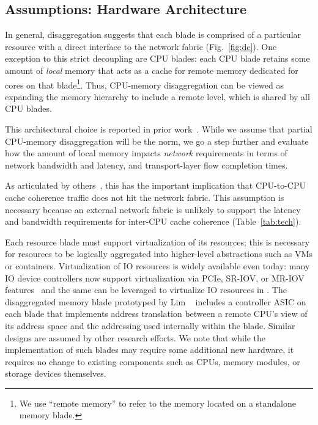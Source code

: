 \vspace{-0.1in}
\subsection{Assumptions: Hardware Architecture}
\vspace{-0.05in}
\label{ssec:hardware}

In general, disaggregation suggests that each blade is comprised of a particular resource with a direct interface to the network fabric (Fig.~\ref{fig:dc}). 
One exception to this strict decoupling are CPU blades: each CPU blade retains some amount of \emph{local} memory that acts as a cache for remote memory dedicated for cores on that blade\footnote{We use ``remote memory'' to refer to the memory located on a standalone memory blade.}.
Thus, CPU-memory disaggregation can be viewed as expanding the memory hierarchy to include a remote level, which is shared by all CPU blades. 

This architectural choice is reported in prior work~\cite{firebox, ddcHwDesign1, ddcHwDesign2, firebox, huawei}. 
While we assume that partial CPU-memory disaggregation will be the norm, we go a step further and evaluate how the amount of local memory impacts \emph{network} requirements in terms of network bandwidth and latency, and transport-layer flow completion times.
	
 As articulated by others~\cite{firebox,hptm,huawei}, this has the important implication that CPU-to-CPU cache coherence traffic does not hit the network fabric.
This assumption is necessary because an external network fabric is unlikely to support the latency and bandwidth requirements for inter-CPU cache coherence (Table~\ref{tab:tech}).

Each resource blade must support virtualization of its resources; this is necessary for resources to be logically aggregated into higher-level abstractions such as VMs or containers.
Virtualization of IO resources is widely available even today: many IO device controllers now support virtualization via PCIe, SR-IOV, or MR-IOV features~\cite{sriov} and the same can be leveraged to virtualize IO resources in \dis.
The disaggregated memory blade prototyped by Lim \etal~\cite{ddcHwDesign1} includes a controller ASIC on each blade that implements address translation between a remote CPU's view of its address space and the addressing used internally within the blade. Similar designs are assumed by other research efforts. We note that while the implementation of such blades may require some additional new hardware, it requires no change to existing components such as CPUs, memory modules, or storage devices themselves.	

